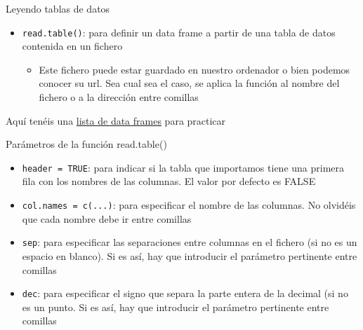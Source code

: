 \documentclass[
  ignorenonframetext,
  aspectratio=169]{beamer}
\providecommand{\tightlist}{%
  \setlength{\itemsep}{0pt}\setlength{\parskip}{0pt}}
\begin{document}
\begin{frame}[fragile]{Leyendo tablas de datos}
\label{leyendo-tablas-de-datos}
\begin{itemize}
\tightlist
\item
  \texttt{read.table()}: para definir un data frame a partir de una
  tabla de datos contenida en un fichero

  \begin{itemize}
  \tightlist
  \item
    Este fichero puede estar guardado en nuestro ordenador o bien
    podemos conocer su url. Sea cual sea el caso, se aplica la función
    al nombre del fichero o a la dirección entre comillas
  \end{itemize}
\end{itemize}

Aquí tenéis una \href{http://aprender.uib.es/}{lista de data frames}
para practicar
\end{frame}

\begin{frame}[fragile]{Parámetros de la función read.table()}
\label{paruxe1metros-de-la-funciuxf3n-read.table}
\begin{itemize}
\tightlist
\item
  \texttt{header\ =\ TRUE}: para indicar si la tabla que importamos
  tiene una primera fila con los nombres de las columnas. El valor por
  defecto es FALSE
\item
  \texttt{col.names\ =\ c(...)}: para especificar el nombre de las
  columnas. No olvidéis que cada nombre debe ir entre comillas
\item
  \texttt{sep}: para especificar las separaciones entre columnas en el
  fichero (si no es un espacio en blanco). Si es así, hay que introducir
  el parámetro pertinente entre comillas
\item
  \texttt{dec}: para especificar el signo que separa la parte entera de
  la decimal (si no es un punto. Si es así, hay que introducir el
  parámetro pertinente entre comillas
\end{itemize}
\end{frame}
\end{document}
